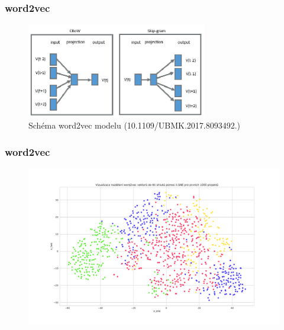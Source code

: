 \documentclass{beamer}
\begin{document}
\begin{frame}
\frametitle{word2vec}

  \begin{figure}[t]
      \centering
      \includegraphics[width=0.7\textwidth,height=\textheight,keepaspectratio]{figures/word2vec_diagram.png}
      \caption{Schéma word2vec modelu {\tiny (10.1109/UBMK.2017.8093492.)}}
      \label{fig:used}
  \end{figure}

\end{frame}


\begin{frame}
\frametitle{word2vec}

  \begin{figure}[t]
      \centering
      \includegraphics[width=\textwidth,height=\textheight,keepaspectratio]{figures/word2vec_tsne.pdf}
      \label{fig:used}
  \end{figure}

\end{frame}
\end{document}
